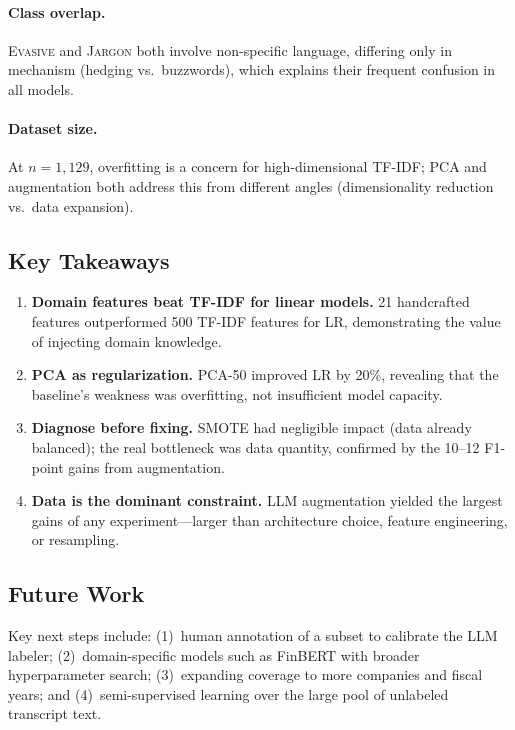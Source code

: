 \documentclass[12pt]{article}
\begin{document}
\paragraph{Class overlap.} \textsc{Evasive} and \textsc{Jargon} both
involve non-specific language, differing only in mechanism (hedging
vs.\ buzzwords), which explains their frequent confusion in all models.

\paragraph{Dataset size.} At $n = 1{,}129$, overfitting is a concern
for high-dimensional TF-IDF; PCA and augmentation both address this from
different angles (dimensionality reduction vs.\ data expansion).

\subsection{Key Takeaways}

\begin{enumerate}[nosep]
    \item \textbf{Domain features beat TF-IDF for linear models.}
          21 handcrafted features outperformed 500 TF-IDF features for LR,
          demonstrating the value of injecting domain knowledge.
    \item \textbf{PCA as regularization.} PCA-50 improved LR by 20\%,
          revealing that the baseline's weakness was overfitting, not
          insufficient model capacity.
    \item \textbf{Diagnose before fixing.} SMOTE had negligible impact
          (data already balanced); the real bottleneck was data quantity,
          confirmed by the 10--12 F1-point gains from augmentation.
    \item \textbf{Data is the dominant constraint.} LLM augmentation
          yielded the largest gains of any experiment---larger than
          architecture choice, feature engineering, or resampling.
\end{enumerate}

\subsection{Future Work}

Key next steps include: (1)~human annotation of a subset to calibrate
the LLM labeler; (2)~domain-specific models such as FinBERT with broader
hyperparameter search; (3)~expanding coverage to more companies and
fiscal years; and (4)~semi-supervised learning over the large pool of
unlabeled transcript text.
\end{document}
